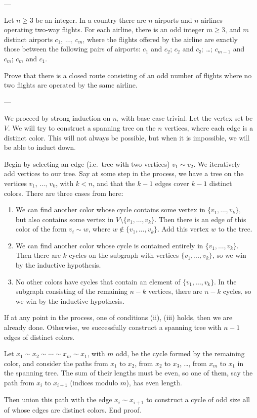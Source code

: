 
---

Let $n\ge3$ be an integer. In a country there are $n$ airports and $n$ airlines operating two-way flights. For each airline, there is an odd integer $m\ge3$, and $m$ distinct airports $c_1$, $\ldots$, $c_m$, where the flights offered by the airline are exactly those between the following pairs of airports: $c_1$ and $c_2$; $c_2$ and $c_3$; \ldots; $c_{m-1}$ and $c_m$; $c_m$ and $c_1$.

Prove that there is a closed route consisting of an odd number of flights where no two flights are operated by the same airline.

---

We proceed by strong induction on $n$, with base case trivial. Let the vertex set be $V$. We will try to construct a spanning tree on the $n$ vertices, where each edge is a distinct color. This will not always be possible, but when it is impossible, we will be able to induct down.

Begin by selecting an edge (i.e.\ tree with two vertices) $v_1\sim v_2$. We iteratively add vertices to our tree. Say at some step in the process, we have a tree on the vertices $v_1$, $\ldots$, $v_k$, with $k<n$, and that the $k-1$ edges cover $k-1$ distinct colors. There are three cases from here:
\begin{enumerate}[label=(\roman*)]
    \item We can find another color whose cycle contains some vertex in $\{v_1,\ldots,v_k\}$, but also contains some vertex in $V\setminus\{v_1,\ldots,v_k\}$. Then there is an edge of this color of the form $v_i\sim w$, where $w\notin\{v_1,\ldots,v_k\}$. Add this vertex $w$ to the tree.
    \item We can find another color whose cycle is contained entirely in $\{v_1,\ldots,v_k\}$. Then there are $k$ cycles on the subgraph with vertices $\{v_1,\ldots,v_k\}$, so we win by the inductive hypothesis.
    \item No other colors have cycles that contain an element of $\{v_1,\ldots,v_k\}$. In the subgraph consisting of the remaining $n-k$ vertices, there are $n-k$ cycles, so we win by the inductive hypothesis.
\end{enumerate}
If at any point in the process, one of conditions (ii), (iii) holds, then we are already done. Otherwise, we successfully construct a spanning tree with $n-1$ edges of distinct colors.

Let $x_1\sim x_2\sim\cdots\sim x_m\sim x_1$, with $m$ odd, be the cycle formed by the remaining color, and consider the paths from $x_1$ to $x_2$, from $x_2$ to $x_3$, \ldots, from $x_m$ to $x_1$ in the spanning tree. The sum of their lengths must be even, so one of them, say the path from $x_i$ to $x_{i+1}$ (indices modulo $m$), has even length.

Then union this path with the edge $x_i\sim x_{i+1}$ to construct a cycle of odd size all of whose edges are distinct colors. End proof.

